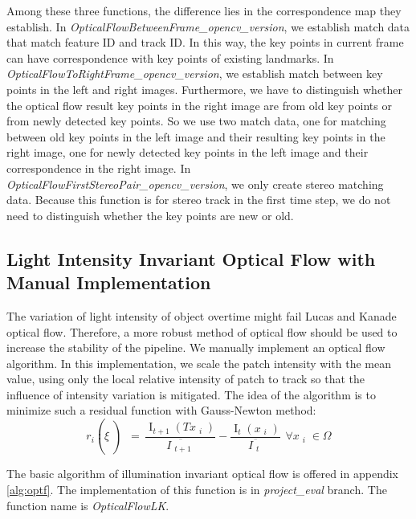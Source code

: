 \documentclass{easychair}
\begin{document}
Among these three functions, the difference lies in the correspondence map they establish. In \emph{OpticalFlowBetweenFrame\_opencv\_version}, we establish match data that match feature ID and track ID. In this way, the key points in current frame can have correspondence with key points of existing landmarks. In \emph{OpticalFlowToRightFrame\_opencv\_version}, we establish match between key points in the left and right images. Furthermore, we have to distinguish whether the optical flow result key points in the right image are from old key points or from newly detected key points. So we use two match data, one for matching between old key points in the left image and their resulting key points in the right image, one for newly detected key points in the left image and their correspondence in the right image. In \emph{OpticalFlowFirstStereoPair\_opencv\_version}, we only create stereo matching data. Because this function is for stereo track in the first time step, we do not need to distinguish whether the key points are new or old.

\subsection{Light Intensity Invariant Optical Flow with Manual Implementation}
The variation of light intensity of object overtime might fail Lucas and Kanade optical flow. Therefore, a more robust method of optical flow should be used to increase the stability of the pipeline. We manually implement an optical flow algorithm. In this implementation, we scale the patch intensity with the mean value, using only the local relative intensity of patch to track so that the influence of intensity variation is mitigated. The idea of the algorithm is to minimize such a residual function with Gauss-Newton method\cite{basalt}:\\

\[{{r_i \left(  \xi  \left) \text{ }=\text{ }\frac{{\mathop{{I}}\nolimits_{{t+1}} \left( Tx\mathop{{}}\nolimits_{{i}} \right) }}{{ \overline {I\mathop{{}}\nolimits_{{t+1}}}}}\right. \right. }-\frac{{\mathop{{I}}\nolimits_{{t}} \left( x\mathop{{}}\nolimits_{{i}} \right) }}{{ \overline {I\mathop{{}}\nolimits_{{t}}}}}\text{ }\text{ } \forall x\mathop{{}}\nolimits_{{i}} \in  \Omega }\]

The basic algorithm of illumination invariant optical flow is offered in appendix \ref{alg:optf}. The implementation of this function is in \emph{project\_eval} branch. The function name is \emph{OpticalFlowLK}.
\end{document}
